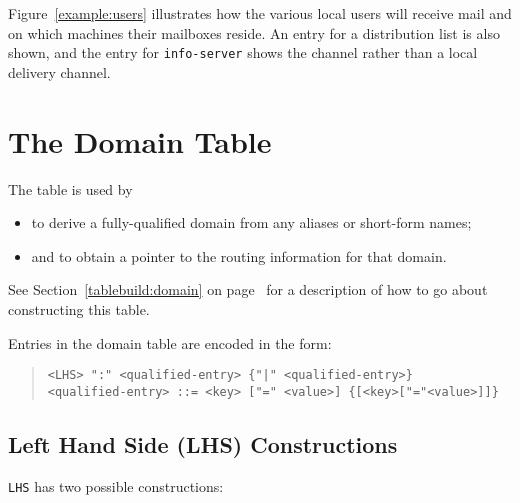 
Figure~\ref{example:users} illustrates how the various local users
will receive mail 
and on which machines their mailboxes reside.
An entry for a distribution list is also shown, and the entry for
\verb+info-server+ shows the  channel rather than a local
delivery channel.

\section {The Domain Table}\label{table:domain}

The  table is used by  
\begin{itemize}
\item to derive a fully-qualified
domain from any aliases or short-form names;
\item and to obtain a pointer to
the routing information for that domain.
\end{itemize}
See
Section~\ref{tablebuild:domain} on page~\pageref{tablebuild:domain} for a
description of how to go about constructing this table. 

Entries in the domain table are encoded in the form:

\begin{quote}\small\begin{verbatim}
<LHS> ":" <qualified-entry> {"|" <qualified-entry>}
<qualified-entry> ::= <key> ["=" <value>] {[<key>["="<value>]]}
\end{verbatim}\end{quote}

\subsection*{Left Hand Side (LHS) Constructions}

\verb+LHS+ has two possible constructions:

